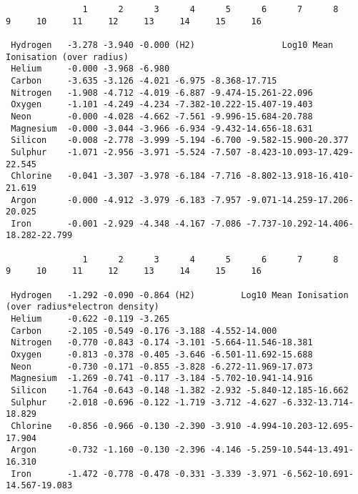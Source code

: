 {\setverbatimfontsize{\tiny}
\begin{verbatim}
               1      2      3      4      5      6      7      8      9     10     11     12     13     14     15     16

 Hydrogen   -3.278 -3.940 -0.000 (H2)                 Log10 Mean Ionisation (over radius)
 Helium     -0.000 -3.968 -6.980
 Carbon     -3.635 -3.126 -4.021 -6.975 -8.368-17.715
 Nitrogen   -1.908 -4.712 -4.019 -6.887 -9.474-15.261-22.096
 Oxygen     -1.101 -4.249 -4.234 -7.382-10.222-15.407-19.403
 Neon       -0.000 -4.028 -4.662 -7.561 -9.996-15.684-20.788
 Magnesium  -0.000 -3.044 -3.966 -6.934 -9.432-14.656-18.631
 Silicon    -0.008 -2.778 -3.999 -5.194 -6.700 -9.582-15.900-20.377
 Sulphur    -1.071 -2.956 -3.971 -5.524 -7.507 -8.423-10.093-17.429-22.545
 Chlorine   -0.041 -3.307 -3.978 -6.184 -7.716 -8.802-13.918-16.410-21.619
 Argon      -0.000 -4.912 -3.979 -6.183 -7.957 -9.071-14.259-17.206-20.025
 Iron       -0.001 -2.929 -4.348 -4.167 -7.086 -7.737-10.292-14.406-18.282-22.799

               1      2      3      4      5      6      7      8      9     10     11     12     13     14     15     16

 Hydrogen   -1.292 -0.090 -0.864 (H2)         Log10 Mean Ionisation (over radius*electron density)
 Helium     -0.622 -0.119 -3.265
 Carbon     -2.105 -0.549 -0.176 -3.188 -4.552-14.000
 Nitrogen   -0.770 -0.843 -0.174 -3.101 -5.664-11.546-18.381
 Oxygen     -0.813 -0.378 -0.405 -3.646 -6.501-11.692-15.688
 Neon       -0.730 -0.171 -0.855 -3.828 -6.272-11.969-17.073
 Magnesium  -1.269 -0.741 -0.117 -3.184 -5.702-10.941-14.916
 Silicon    -1.764 -0.643 -0.148 -1.382 -2.932 -5.840-12.185-16.662
 Sulphur    -2.018 -0.696 -0.122 -1.719 -3.712 -4.627 -6.332-13.714-18.829
 Chlorine   -0.856 -0.966 -0.130 -2.390 -3.910 -4.994-10.203-12.695-17.904
 Argon      -0.732 -1.160 -0.130 -2.396 -4.146 -5.259-10.544-13.491-16.310
 Iron       -1.472 -0.778 -0.478 -0.331 -3.339 -3.971 -6.562-10.691-14.567-19.083
\end{verbatim}
}

